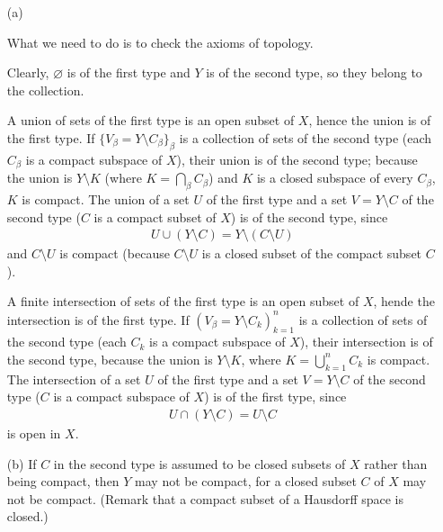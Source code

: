 \begin{sol}
    \begin{enumerate}
        \item[(a)]
        {
            What we need to do is to check the axioms of topology.
            
            Clearly, $\varnothing$ is of the first type and $Y$ is of the second type, so they belong to the collection.

            A union of sets of the first type is an open subset of $X$, hence the union is of the first type.
            If $\{V_\beta=Y\setminus C_\beta\}_\beta$ is a collection of sets of the second type (each $C_\beta$ is a compact subspace of $X$), their union is of the second type; because the union is $Y\setminus K$ (where $K=\bigcap_\beta C_\beta$) and $K$ is a closed subspace of every $C_\beta$, $K$ is compact.
            The union of a set $U$ of the first type and a set $V=Y\setminus C$ of the second type ($C$ is a compact subset of $X$) is of the second type, since
            \begin{align*}
                U\cup (Y\setminus C)=Y\setminus (C\setminus U)
            \end{align*}
            and $C\setminus U$ is compact (because $C\setminus U$ is a closed subset of the compact subset $C$).

            A finite intersection of sets of the first type is an open subset of $X$, hende the intersection is of the first type.
            If $(V_\beta=Y\setminus C_k)_{k=1}^n$ is a collection of sets of the second type (each $C_k$ is a compact subspace of $X$), their intersection is of the second type, because the union is $Y\setminus K$, where $K=\bigcup_{k=1}^n C_k$ is compact.
            The intersection of a set $U$ of the first type and a set $V=Y\setminus C$ of the second type ($C$ is a compact subspace of $X$) is of the first type, since
            \begin{align*}
                U\cap (Y\setminus C)=U\setminus C
            \end{align*}
            is open in $X$.
        }
        \item[(b)]
        {
            If $C$ in the second type is assumed to be closed subsets of $X$ rather than being compact, then $Y$ may not be compact, for a closed subset $C$ of $X$ may not be compact.
            (Remark that a compact subset of a Hausdorff space is closed.)
        }
    \end{enumerate}
\end{sol}

